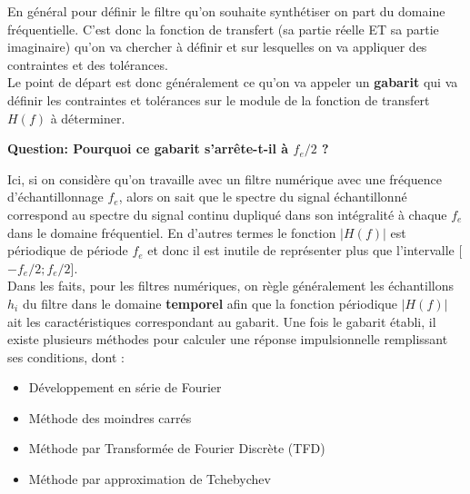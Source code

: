 \documentclass[11pt,a4paper]{article}
\begin{document}
En général pour définir le filtre qu'on souhaite synthétiser on part du domaine fréquentielle. C'est donc la fonction de transfert (sa partie réelle ET sa partie imaginaire) qu'on va chercher à définir et sur lesquelles on va appliquer des contraintes et des tolérances.\\

Le point de départ est donc généralement ce qu'on va appeler un \textbf{gabarit} qui va définir les contraintes et tolérances sur le module de la fonction de transfert $H(f)$ à déterminer.

\begin{center}
\end{center}

\textbf{Question: Pourquoi ce gabarit s'arrête-t-il à $f_e/2$ ?}

Ici, si on considère qu'on travaille avec un filtre numérique avec une fréquence d'échantillonnage $f_e$, alors on sait que le spectre du signal échantillonné correspond au spectre du signal continu dupliqué dans son intégralité à chaque $f_e$ dans le domaine fréquentiel. En d'autres termes le fonction $|H(f)|$ est périodique de période $f_e$ et donc il est inutile de représenter plus que l'intervalle [$-f_e/2;f_e/2$].\\

Dans les faits, pour les filtres numériques, on règle généralement les échantillons $h_i$ du filtre dans le domaine \textbf{temporel} afin que la fonction périodique $|H(f)|$ ait les caractéristiques correspondant au gabarit. Une fois le gabarit établi, il existe plusieurs méthodes pour calculer une réponse impulsionnelle remplissant ses conditions, dont :
\begin{itemize}
\item Développement en série de Fourier
\item Méthode des moindres carrés
\item Méthode par Transformée de Fourier Discrète (TFD)
\item Méthode par approximation de Tchebychev
\end{itemize}
\end{document}
